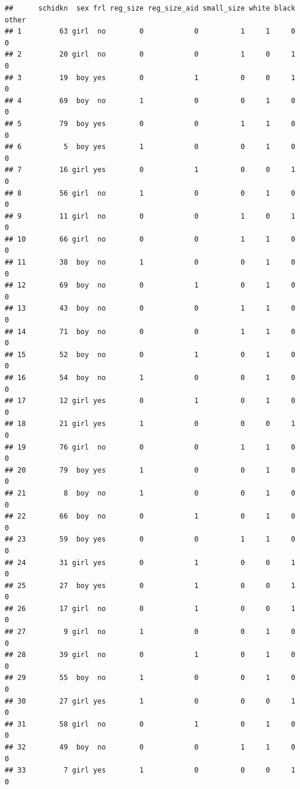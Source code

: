 \documentclass[man]{apa6}
\begin{document}
\begin{verbatim}
##      schidkn  sex frl reg_size reg_size_aid small_size white black other
## 1         63 girl  no        0            0          1     1     0     0
## 2         20 girl  no        0            0          1     0     1     0
## 3         19  boy yes        0            1          0     0     1     0
## 4         69  boy  no        1            0          0     1     0     0
## 5         79  boy yes        0            0          1     1     0     0
## 6          5  boy yes        1            0          0     1     0     0
## 7         16 girl yes        0            1          0     0     1     0
## 8         56 girl  no        1            0          0     1     0     0
## 9         11 girl  no        0            0          1     0     1     0
## 10        66 girl  no        0            0          1     1     0     0
## 11        38  boy  no        1            0          0     1     0     0
## 12        69  boy  no        0            1          0     1     0     0
## 13        43  boy  no        0            0          1     1     0     0
## 14        71  boy  no        0            0          1     1     0     0
## 15        52  boy  no        0            1          0     1     0     0
## 16        54  boy  no        1            0          0     1     0     0
## 17        12 girl yes        0            1          0     1     0     0
## 18        21 girl yes        1            0          0     0     1     0
## 19        76 girl  no        0            0          1     1     0     0
## 20        79  boy yes        1            0          0     1     0     0
## 21         8  boy  no        1            0          0     1     0     0
## 22        66  boy  no        0            1          0     1     0     0
## 23        59  boy yes        0            0          1     1     0     0
## 24        31 girl yes        0            1          0     0     1     0
## 25        27  boy yes        0            1          0     0     1     0
## 26        17 girl  no        0            1          0     0     1     0
## 27         9 girl  no        1            0          0     1     0     0
## 28        39 girl  no        0            1          0     1     0     0
## 29        55  boy  no        1            0          0     1     0     0
## 30        27 girl yes        1            0          0     0     1     0
## 31        58 girl  no        0            1          0     1     0     0
## 32        49  boy  no        0            0          1     1     0     0
## 33         7 girl yes        1            0          0     0     1     0

\end{verbatim}
\end{document}
